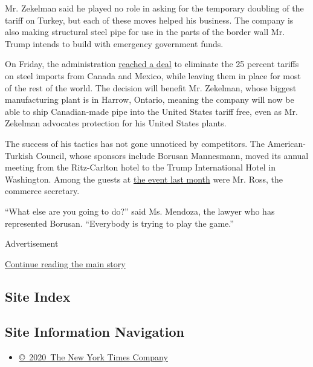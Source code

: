 Mr. Zekelman said he played no role in asking for the temporary doubling
of the tariff on Turkey, but each of these moves helped his business.
The company is also making structural steel pipe for use in the parts of
the border wall Mr. Trump intends to build with emergency government
funds.

On Friday, the administration
\href{https://www.nytimes.com/2019/05/17/business/tariffs-metals-canada-mexico.html}{reached
a deal} to eliminate the 25 percent tariffs on steel imports from Canada
and Mexico, while leaving them in place for most of the rest of the
world. The decision will benefit Mr. Zekelman, whose biggest
manufacturing plant is in Harrow, Ontario, meaning the company will now
be able to ship Canadian-made pipe into the United States tariff free,
even as Mr. Zekelman advocates protection for his United States plants.

The success of his tactics has not gone unnoticed by competitors. The
American-Turkish Council, whose sponsors include Borusan Mannesmann,
moved its annual meeting from the Ritz-Carlton hotel to the Trump
International Hotel in Washington. Among the guests at
\href{http://atctaikconference.com/}{the event last month} were Mr.
Ross, the commerce secretary.

``What else are you going to do?'' said Ms. Mendoza, the lawyer who has
represented Borusan. ``Everybody is trying to play the game.''

Advertisement

\protect\hyperlink{after-bottom}{Continue reading the main story}

\hypertarget{site-index}{%
\subsection{Site Index}\label{site-index}}

\hypertarget{site-information-navigation}{%
\subsection{Site Information
Navigation}\label{site-information-navigation}}

\begin{itemize}
\tightlist
\item
  \href{https://help.nytimes.com/hc/en-us/articles/115014792127-Copyright-notice}{©~2020~The
  New York Times Company}
\end{itemize}

